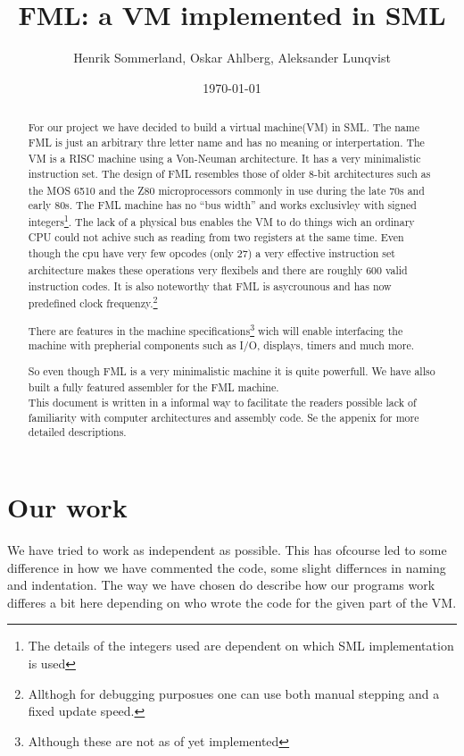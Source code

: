 \documentclass{article}
\title{FML: a VM implemented in SML}
\author{Henrik Sommerland, Oskar Ahlberg, Aleksander Lunqvist}
\date{\today}
\begin{document}
\maketitle
\begin{abstract}
For our project we have decided to build a virtual 
machine(VM)\textsuperscript{\cite{Virtual}} in SML.
The name FML is just an arbitrary thre letter name and has no meaning or interpertation.
The VM is a RISC\textsuperscript{\cite{risc}} machine using a Von-Neuman
architecture. It has a very minimalistic instruction set. The design of FML resembles those of older 8-bit
architectures such as the MOS 6510\textsuperscript{\cite{6510}} and the
Z80\textsuperscript{\cite{z80}} microprocessors commonly in use during the late
70s and early 80s. The FML machine has no ``bus width'' and works exclusivley with signed integers\footnote{The details of the integers
used are dependent on which SML implementation is used}. The lack of a physical
bus enables the VM to do things wich an ordinary CPU could not achive such as
reading from two registers at the same time. Even though
the cpu have very few opcodes\textsuperscript{\cite{opcode}} (only 27) a very
effective instruction set architecture\textsuperscript{\cite{ISA}} makes these operations very flexibels
and there are roughly 600 valid instruction codes. It is also noteworthy that
FML is asycrounous\textsuperscript{\cite{async}} and has now predefined clock
frequenzy.\footnote{Allthogh for debugging purposues one can use both manual stepping and a fixed update speed.}

There are features in the machine specifications\footnote{Although these are
not as of yet implemented} wich will enable interfacing the machine with
prepherial components such as I/O, displays, timers and much more.

So even though FML is a very minimalistic machine it is quite powerfull.
We have allso built a fully featured assembler\textsuperscript{\cite{assembler}}
for the FML machine.
\\
This document is written in a informal way to facilitate the readers possible
lack of familiarity with computer architectures and assembly code. Se the
appenix for more detailed descriptions.
\end{abstract}
\newpage
\tableofcontents
\newpage
\section{Our work}
We have tried to work as independent as possible. This has ofcourse led to some
difference in how we have commented the code, some slight differnces in naming
and indentation. The way we have chosen do describe how our programs work
differes a bit here depending on who wrote the code for the given part of the
VM.
\end{document}
